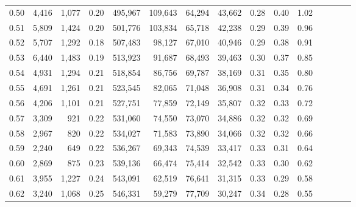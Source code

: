 \begin{tabular}{rrrcrrrrrrrrrrr}
0.50 &   4,416 &   1,077 &                                       0.20 &  495,967 &  109,643 &   64,294 &   43,662 &  0.28 &  0.40 &                         1.02 \\
0.51 &   5,809 &   1,424 &                                       0.20 &  501,776 &  103,834 &   65,718 &   42,238 &  0.29 &  0.39 &                         0.96 \\
0.52 &   5,707 &   1,292 &                                       0.18 &  507,483 &   98,127 &   67,010 &   40,946 &  0.29 &  0.38 &                         0.91 \\
0.53 &   6,440 &   1,483 &                                       0.19 &  513,923 &   91,687 &   68,493 &   39,463 &  0.30 &  0.37 &                         0.85 \\
0.54 &   4,931 &   1,294 &                                       0.21 &  518,854 &   86,756 &   69,787 &   38,169 &  0.31 &  0.35 &                         0.80 \\
0.55 &   4,691 &   1,261 &                                       0.21 &  523,545 &   82,065 &   71,048 &   36,908 &  0.31 &  0.34 &                         0.76 \\
0.56 &   4,206 &   1,101 &                                       0.21 &  527,751 &   77,859 &   72,149 &   35,807 &  0.32 &  0.33 &                         0.72 \\
0.57 &   3,309 &     921 &                                       0.22 &  531,060 &   74,550 &   73,070 &   34,886 &  0.32 &  0.32 &                         0.69 \\
0.58 &   2,967 &     820 &                                       0.22 &  534,027 &   71,583 &   73,890 &   34,066 &  0.32 &  0.32 &                         0.66 \\
0.59 &   2,240 &     649 &                                       0.22 &  536,267 &   69,343 &   74,539 &   33,417 &  0.33 &  0.31 &                         0.64 \\
0.60 &   2,869 &     875 &                                       0.23 &  539,136 &   66,474 &   75,414 &   32,542 &  0.33 &  0.30 &                         0.62 \\
0.61 &   3,955 &   1,227 &                                       0.24 &  543,091 &   62,519 &   76,641 &   31,315 &  0.33 &  0.29 &                         0.58 \\
0.62 &   3,240 &   1,068 &                                       0.25 &  546,331 &   59,279 &   77,709 &   30,247 &  0.34 &  0.28 &                         0.55 \\

\end{tabular}
